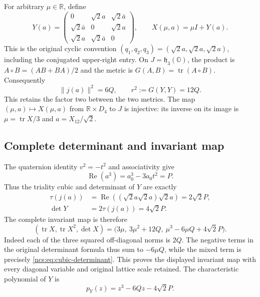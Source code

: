 \documentclass[11pt]{article}
\theoremstyle{definition}
\begin{document}
For arbitrary $\mu\in\mathbb R$, define
\begin{equation}
 Y(a)=\begin{pmatrix}
 0&\sqrt2a&\sqrt2\bar a\\
 \sqrt2\bar a&0&\sqrt2a\\
 \sqrt2a&\sqrt2\bar a&0
 \end{pmatrix},\qquad
 X(\mu,a)=\mu I+Y(a).
 \label{ncs:eq:original-matrix}\tag{NCS4}
\end{equation}
This is the original cyclic convention
$(q_1,q_2,q_3)=(\sqrt2a,\sqrt2a,\sqrt2a)$, including the
conjugated upper-right entry. On $J=\mathfrak h_3(\mathbb O)$,
the product is $A\circ B=(AB+BA)/2$ and the metric is
$G(A,B)=\operatorname{tr}(A\circ B)$. Consequently
\begin{equation}
 \|j(a)\|^2=6Q,\qquad r^2:=G(Y,Y)=12Q.
 \label{ncs:eq:two-metrics}\tag{NCS5}
\end{equation}
This retains the factor two between the two metrics. The map
$(\mu,a)\mapsto X(\mu,a)$ from $\mathbb R\times D_4$ to $J$
is injective: its inverse on its image is
$\mu=\operatorname{tr}X/3$ and $a=X_{12}/\sqrt2$.

\subsection{Complete determinant and invariant map}
\label{ncs:sec:invariant-map}

The quaternion identity $v^2=-t^2$ and associativity give
\[
 \operatorname{Re}(a^3)=a_0^3-3a_0t^2=P.
\]
Thus the triality cubic and determinant of $Y$ are exactly
\begin{equation}
 \begin{aligned}
 \tau(j(a))
 &=\operatorname{Re}((\sqrt2a\sqrt2a)\sqrt2a)=2\sqrt2P,\\
 \det Y&=2\tau(j(a))=4\sqrt2P.
 \end{aligned}
 \label{ncs:eq:cubic-determinant}\tag{NCS6}
\end{equation}
The complete invariant map is therefore
\begin{equation}
 \boxed{
 (\operatorname{tr}X,\operatorname{tr}X^2,\det X)
   =\bigl(3\mu,\ 3\mu^2+12Q,\
                     \mu^3-6\mu Q+4\sqrt2P\bigr).
 }
 \label{ncs:eq:full-invariants}\tag{NCS7}
\end{equation}
Indeed each of the three squared off-diagonal norms is $2Q$.
The negative terms in the original determinant formula thus sum
to $-6\mu Q$, while the mixed term is precisely
\eqref{ncs:eq:cubic-determinant}. This proves the displayed
invariant map with every diagonal variable and original lattice
scale retained. The characteristic polynomial of $Y$ is
\begin{equation}
 p_Y(z)=z^3-6Qz-4\sqrt2P.
 \label{ncs:eq:characteristic-polynomial}\tag{NCS8}
\end{equation}
\end{document}
